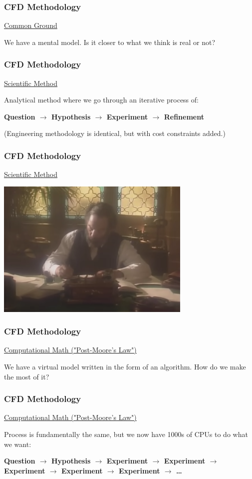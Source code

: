 \documentclass[12pt]{beamer}
\begin{document}
\begin{frame}
    \frametitle{CFD Methodology}
    \underline{Common Ground}

    We have a mental model. Is it closer to what we think is real or not?
\end{frame}
\begin{frame}
    \frametitle{CFD Methodology}
    \underline{Scientific Method}

    Analytical method where we go through an iterative process of:

    \textbf{Question $\rightarrow$ Hypothesis $\rightarrow$ Experiment $\rightarrow$ Refinement}

    (Engineering methodology is identical, but with cost constraints added.)
\end{frame}
\begin{frame}
    \frametitle{CFD Methodology}
    \underline{Scientific Method}

    \includegraphics[width=0.7\textwidth]{img/0-caltech-maxwell.png}
\end{frame}
\begin{frame}
    \frametitle{CFD Methodology}
    \underline{Computational Math ("Post-Moore's Law")}

    We have a virtual model written in the form of an algorithm. How do we make the most of it?
\end{frame}
\begin{frame}
    \frametitle{CFD Methodology}
    \underline{Computational Math ("Post-Moore's Law")}

    Process is fundamentally the same, but we now have 1000s of CPUs to do 
    what we want:

    \textbf{Question $\rightarrow$ Hypothesis $\rightarrow$ Experiment $\rightarrow$ Experiment $\rightarrow$ Experiment $\rightarrow$ Experiment $\rightarrow$ Experiment $\rightarrow$ \dots}
\end{frame}
\end{document}
